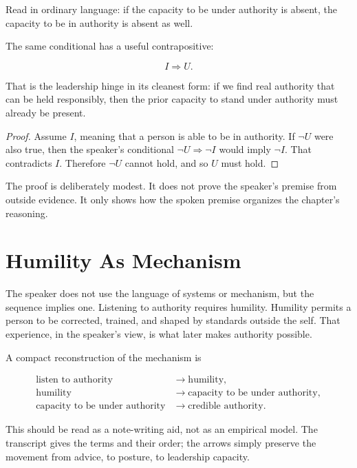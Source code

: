 Read in ordinary language: if the capacity to be under authority is absent, the capacity to be in authority is absent as well.

The same conditional has a useful contrapositive:

\begin{equation}
I \Longrightarrow U.
\end{equation}

That is the leadership hinge in its cleanest form: if we find real authority that can be held responsibly, then the prior capacity to stand under authority must already be present.

\begin{proof}
Assume \(I\), meaning that a person is able to be in authority. If \(\neg U\) were also true, then the speaker's conditional \(\neg U \Longrightarrow \neg I\) would imply \(\neg I\). That contradicts \(I\). Therefore \(\neg U\) cannot hold, and so \(U\) must hold.
\end{proof}

The proof is deliberately modest. It does not prove the speaker's premise from outside evidence. It only shows how the spoken premise organizes the chapter's reasoning.

\section{Humility As Mechanism}

The speaker does not use the language of systems or mechanism, but the sequence implies one. Listening to authority requires humility. Humility permits a person to be corrected, trained, and shaped by standards outside the self. That experience, in the speaker's view, is what later makes authority possible.

A compact reconstruction of the mechanism is

\begin{align}
\text{listen to authority}
&\longrightarrow
\text{humility},\\
\text{humility}
&\longrightarrow
\text{capacity to be under authority},\\
\text{capacity to be under authority}
&\longrightarrow
\text{credible authority}.
\end{align}

This should be read as a note-writing aid, not as an empirical model. The transcript gives the terms and their order; the arrows simply preserve the movement from advice, to posture, to leadership capacity.

